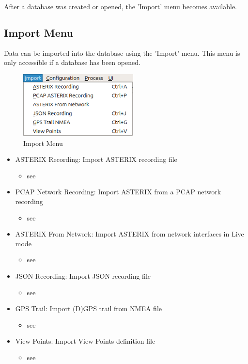 After a database was created or opened, the 'Import' menu becomes available.

\subsection{Import Menu}
\label{sec:ui_overview_import_menu}

Data can be imported into the database using the 'Import' menu. This menu is only accessible if a database has been opened.

\begin{figure}[H]
  \center
    \includegraphics[width=6cm,frame]{figures/ui_import_menu.png}
  \caption{Import Menu}
\end{figure}

\begin{itemize}
 \item ASTERIX Recording: Import ASTERIX recording file
 \begin{itemize}
 \item see 
 \end{itemize}
 \item PCAP Network Recording: Import ASTERIX from a PCAP network recording
  \begin{itemize}
 \item see 
 \end{itemize}
 \item ASTERIX From Network: Import ASTERIX from network interfaces in Live mode
  \begin{itemize}
 \item see 
 \end{itemize}
 \item JSON Recording: Import JSON recording file
  \begin{itemize}
 \item see 
 \end{itemize}
 \item GPS Trail: Import (D)GPS trail from NMEA file
  \begin{itemize}
 \item see 
 \end{itemize}
 \item View Points: Import View Points definition file
  \begin{itemize}
 \item see 
 \end{itemize}
\end{itemize}
\  \\

